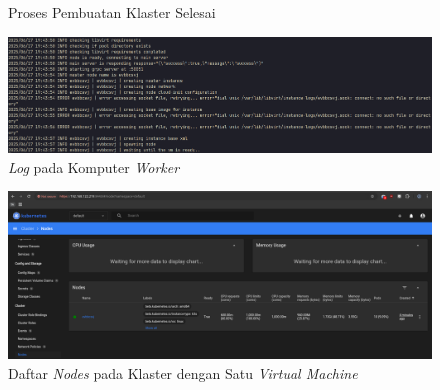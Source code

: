\begin{figure}[H]
  \centering
  \caption{Proses Pembuatan Klaster Selesai}
  \label{fig:proses-pembuatan-klaster-selesai}
\end{figure}

\begin{figure}[H]
  \centering
  \includegraphics[scale=0.3]{gambar/worker-create-cluster-process-local.png}
  \caption{\emph{Log} pada Komputer \emph{Worker}}
  \label{fig:worker-create-cluster-process-local}
\end{figure}

\begin{figure}[H]
  \centering
  \includegraphics[scale=0.3]{gambar/kubernetes-dashboard-access-local-with-nodes.png}
  \caption{Daftar \emph{Nodes} pada Klaster dengan Satu \emph{Virtual Machine}}
  \label{fig:daftar-nodes-pada-dashboard-kubernetes}
\end{figure}

